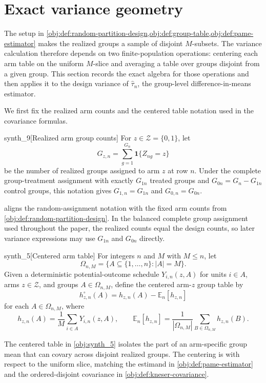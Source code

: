 \documentclass[11pt]{article}
\begin{document}
\section{Exact variance geometry}\label{sec:exact-variance}

The setup in \cref{obj:def:random-partition-design,obj:def:group-table,obj:def:pame-estimator} makes the realized groups a sample of disjoint \(M\)-subsets. The variance calculation therefore depends on two finite-population operations: centering each arm table on the uniform \(M\)-slice and averaging a table over groups disjoint from a given group. This section records the exact algebra for those operations and then applies it to the design variance of \(\widehat\tau_n\), the group-level difference-in-means estimator.

We first fix the realized arm counts and the centered table notation used in the covariance formulas.

\begin{definitionv}{synth_9}[Realized arm group counts]
For \(z\in\mathcal Z=\{0,1\}\), let
\[
G_{z,n}=\sum_{g=1}^{G_n}\mathbf 1\{Z_{ng}=z\}
\]
be the number of realized groups assigned to arm \(z\) at row \(n\). Under the complete group-treatment assignment with exactly \(G_{1n}\) treated groups and \(G_{0n}=G_n-G_{1n}\) control groups, this notation gives \(G_{1,n}=G_{1n}\) and \(G_{0,n}=G_{0n}\).
\end{definitionv}

 aligns the random-assignment notation with the fixed arm counts from \cref{obj:def:random-partition-design}. In the balanced complete group assignment used throughout the paper, the realized counts equal the design counts, so later variance expressions may use \(G_{1n}\) and \(G_{0n}\) directly.

\begin{definitionv}{synth_5}[Centered arm table]
For integers \(n\) and \(M\) with \(M\le n\), let
\[
\Omega_{n,M}=\{A\subseteq \{1,\ldots,n\}: |A|=M\}.
\]
Given a deterministic potential-outcome schedule \(Y_{i,n}(z,A)\) for units \(i\in A\), arms \(z\in\mathcal Z\), and groups \(A\in\Omega_{n,M}\), define the centered arm-\(z\) group table by
\[
h_{z,n}^{\circ}(A)
=
h_{z,n}(A)-\mathbb E_n[h_{z,n}]
\]
for each \(A\in\Omega_{n,M}\), where
\[
h_{z,n}(A)=\frac{1}{M}\sum_{i\in A}Y_{i,n}(z,A),
\qquad
\mathbb E_n[h_{z,n}]
=
\frac{1}{|\Omega_{n,M}|}\sum_{B\in\Omega_{n,M}} h_{z,n}(B).
\]
\end{definitionv}

The centered table in \cref{obj:synth_5} isolates the part of an arm-specific group mean that can covary across disjoint realized groups. The centering is with respect to the uniform slice, matching the estimand in \cref{obj:def:pame-estimator} and the ordered-disjoint covariance in \cref{obj:def:kneser-covariance}.
\end{document}
